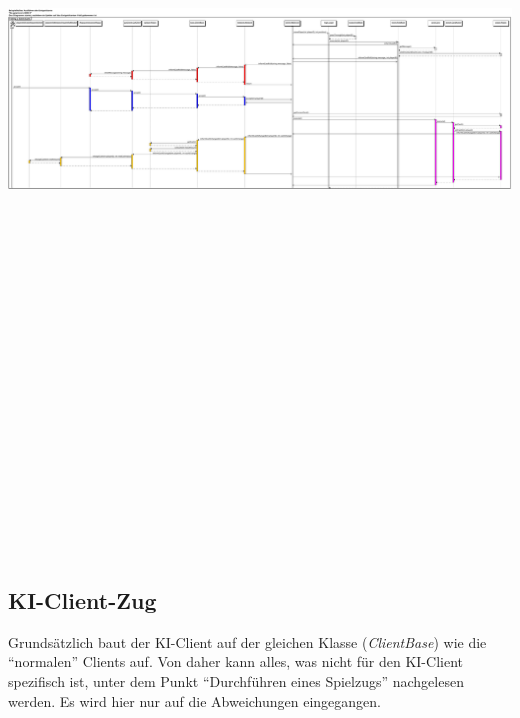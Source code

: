 \documentclass[a4paper,10pt]{article}
\begin{document}
\includegraphics[angle = 90,height=24cm]{Sequenzdiagramme/Ereigniskarte}


\subsection{KI-Client-Zug}
Grundsätzlich baut der KI-Client auf der gleichen Klasse (\textit{ClientBase}) wie die "`normalen"' Clients auf. Von daher kann alles, was nicht für den KI-Client spezifisch ist, unter dem Punkt "`Durchführen eines Spielzugs"' nachgelesen werden. Es wird hier nur auf die Abweichungen eingegangen.
\end{document}
